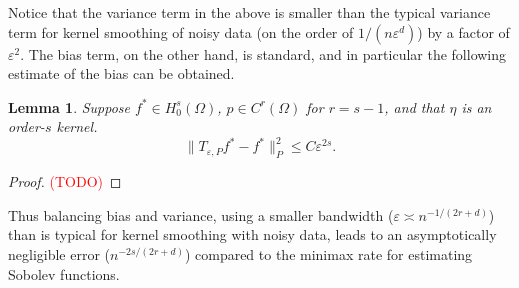 \documentclass{article}
\newcommand{\1}{\mathbf{1}}
\newtheorem{lemma}{Lemma}
\theoremstyle{definition}
\theoremstyle{remark}
\begin{document}
Notice that the variance term in the above is smaller than the typical variance term for kernel smoothing of noisy data (on the order of $1/(n\varepsilon^d)$) by a factor of $\varepsilon^2$. The bias term, on the other hand, is standard, and in particular the following estimate of the bias can be obtained. 
\begin{lemma}
	Suppose $f^{\ast} \in H_0^{s}(\Omega)$, $p \in C^{r}(\Omega)$ for $r = s - 1$, and that $\eta$ is an order-$s$ kernel.
	\begin{equation*}
	\|T_{\varepsilon,P}f^{\ast} - f^{\ast}\|_P^2 \leq C \varepsilon^{2s}.
	\end{equation*}
\end{lemma}
\begin{proof}
	\textcolor{red}{(TODO)}
\end{proof}

Thus balancing bias and variance, using a smaller bandwidth ($\varepsilon \asymp n^{-1/(2r + d)}$) than is typical for kernel smoothing with noisy data, leads to an asymptotically negligible error ($n^{-2s/(2r + d)}$) compared to the minimax rate for estimating Sobolev functions. 
\end{document}
